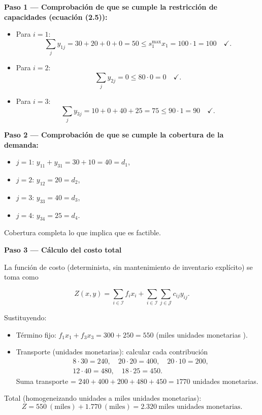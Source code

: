 \documentclass[
  spanish,
  us-letterpaper,
  DIV=11,
  numbers=noendperiod]{scrreprt}
\providecommand{\tightlist}{%
  \setlength{\itemsep}{0pt}\setlength{\parskip}{0pt}}
\numberwithin{equation}{section}
\begin{document}
\textbf{Paso 1 --- Comprobación de que se cumple la restricción de
capacidades (ecuación (2.5)):}

\begin{itemize}
\tightlist
\item
  Para \(i=1\): \[
  \sum_j y_{1j}=30+20+0+0=50 \le s_1^{\max} x_1 = 100\cdot 1 = 100\quad\checkmark.
  \]
\item
  Para \(i=2\): \[
  \sum_j y_{2j}=0 \le 80\cdot 0 = 0\quad\checkmark.
  \]
\item
  Para \(i=3\): \[
  \sum_j y_{3j}=10+0+40+25=75 \le 90\cdot 1 = 90\quad\checkmark.
  \]
\end{itemize}

\textbf{Paso 2 --- Comprobación de que se cumple la cobertura de la
demanda:}

\begin{itemize}
\tightlist
\item
  \(j=1\): \(y_{11}+y_{31}=30+10=40 = d_1\),
\item
  \(j=2\): \(y_{12}=20 = d_2\),
\item
  \(j=3\): \(y_{33}=40 = d_3\),
\item
  \(j=4\): \(y_{34}=25 = d_4\).
\end{itemize}

Cobertura completa lo que implica que es factible.

\textbf{Paso 3 --- Cálculo del costo total}

La función de costo (determinista, sin mantenimiento de inventario
explícito) se toma como

\[
Z(x,y)=\sum_{i\in\mathcal{I}} f_i x_i + \sum_{i\in\mathcal{I}}\sum_{j\in\mathcal{J}} c_{ij} y_{ij}.
\]

Sustituyendo:

\begin{itemize}
\tightlist
\item
  Término fijo: \(f_1 x_1 + f_3 x_3 = 300 + 250 = 550\) (miles unidades
  monetarias ).
\item
  Transporte (unidades monetarias): calcular cada contribución \[
  \begin{aligned}
  &8\cdot 30 = 240,\quad 20\cdot 20 = 400,\quad 20\cdot 10 = 200,\\
  &12\cdot 40 = 480,\quad 18\cdot 25 = 450.
  \end{aligned}
  \] Suma transporte = \(240+400+200+480+450 = 1770\) unidades
  monetarias.
\end{itemize}

Total (homogeneizando unidades a miles unidades monetarias): \[
Z = 550\ (\text{miles}) + 1.770\ (\text{miles}) = 2.320\ \text{miles unidades monetarias}.
\]
\end{document}
